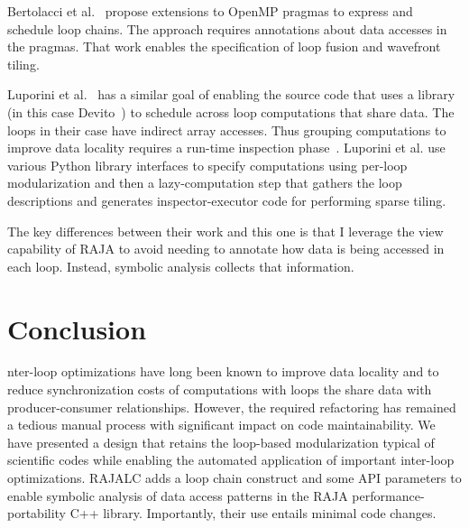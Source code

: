 Bertolacci et al.~\cite{Bertolacci2016,Bertolacci2019} propose extensions to
OpenMP pragmas to express and schedule loop chains.
The approach requires annotations about data accesses in the pragmas.
That work enables the specification of loop fusion and wavefront tiling. 

Luporini et al.~\cite{Luporini2019} has a similar goal of enabling the source
code that uses a library  (in this case Devito~\cite{Luporini2018}) to
schedule across loop computations that share data.
The loops in their case have indirect array accesses.
Thus grouping computations to improve data locality requires a run-time
inspection phase~\cite{Strout14IPDPS}.
Luporini et al. use various Python library interfaces to specify computations
using per-loop modularization and then a lazy-computation step that gathers
the loop descriptions and generates inspector-executor code for performing 
sparse tiling.

The key differences between their work and this one is that I leverage the view 
capability of RAJA to avoid needing to annotate how data is being accessed
in each loop.  
Instead, symbolic analysis collects that information.

\section{Conclusion}
nter-loop optimizations have long been known to improve data locality and 
to reduce synchronization costs of computations with loops the share data
with producer-consumer relationships.
However, the required refactoring has remained a tedious manual process with 
significant impact on code maintainability.
We have presented a design that retains the loop-based modularization typical
of scientific codes while enabling the automated application of important
inter-loop optimizations.
RAJALC adds a loop chain construct and some API parameters to enable symbolic
analysis of data access patterns in the RAJA performance-portability C++
library. 
Importantly, their use entails minimal code changes. 


